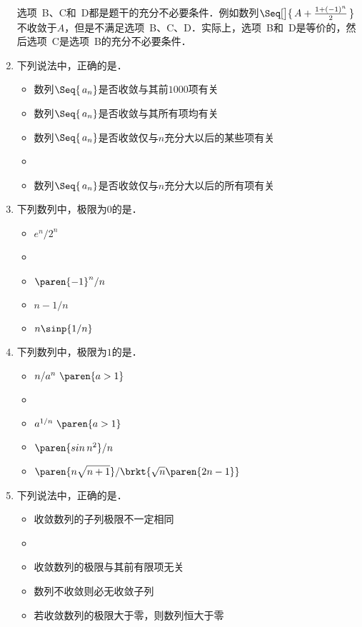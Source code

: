 \begin{enumerate}
  \ifshowsol
    选项~B、C和~D都是题干的充分不必要条件．例如数列\(\Seq[\big]{\,A + \frac{1+(-1)^n}{2}\,}\)不收敛于\(A\)，但是不满足选项~B、C、D．实际上，选项~B和~D是等价的，然后选项~C是选项~B的充分不必要条件．
  \fi

\item 下列说法中，正确的是\uline{\makebox[10em]{}}．
  \begin{itemize}
    \renewcommand{\labelitemi}{\faCircleThin}
  \item 数列\(\Seq{\,a_n}\)是否收敛与其前\(1000\)项有关
  \item 数列\(\Seq{\,a_n}\)是否收敛与其所有项均有关
  \item 数列\(\Seq{\,a_n}\)是否收敛仅与\(n\)充分大以后的某些项有关
    \ifshowsol
    \item[\faCircle]
    \else
    \item
    \fi
    数列\(\Seq{\,a_n}\)是否收敛仅与\(n\)充分大以后的所有项有关
  \end{itemize}

\item 下列数列中，极限为\(0\)的是\uline{\makebox[6em]{}}．
  \begin{itemize}
    \renewcommand{\labelitemi}{\faCircleThin}
  \item \(e^n/2^n\)
    \ifshowsol
    \item[\faCircle]
    \else
    \item
    \fi
    \(\paren{-1}^n/n\)
  \item \(n - 1/n\)
  \item \(n \sinp{1/n}\)
  \end{itemize}

\item 下列数列中，极限为\(1\)的是\uline{\makebox[6em]{}}．
  \begin{itemize}
    \renewcommand{\labelitemi}{\faCircleThin}
  \item \(n/a^n\ \paren{a > 1}\)
    \ifshowsol
    \item[\faCircle]
    \else
    \item
    \fi
    \(a^{1/n}\ \paren{a > 1}\)
  \item \(\paren{\sin n^2}/{n}\)
  \item \(\paren{n \sqrt{n+\smash{1}\mathstrut}}/\brkt{\sqrt n \paren{2n-1}}\)
  \end{itemize}

\item 下列说法中，正确的是\uline{\makebox[10em]{}}．
  \begin{itemize}
    \renewcommand{\labelitemi}{\faCircleThin}
  \item 收敛数列的子列极限不一定相同
    \ifshowsol
    \item[\faCircle]
    \else
    \item
    \fi
    收敛数列的极限与其前有限项无关
  \item 数列不收敛则必无收敛子列
  \item 若收敛数列的极限大于零，则数列恒大于零
  \end{itemize}


\end{enumerate}
